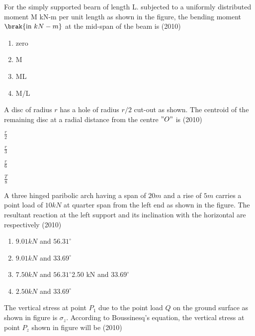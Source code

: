	\item For the simply supported bearn of length L. subjected to a uniformly distributed moment M kN-m per unit length as shown in the figure, the bending moment $\brak{\text{in } kN-m}$ at the mid-span of the beam is
	\hfill{(2010)}
     	
		\begin{enumerate}
			\item zero
            \item M
            \item ML
            \item M/L
        	\end{enumerate}	
	\item  A disc of radius $r$ has a hole of radius $r / 2$ cut-out as shown. The centroid of the remaining disc  at a radial distance from the centre $"O"$ is
	\hfill{(2010)}
        	
		\begin{enumerate}
            \begin{multicols}{2}
			\item $\frac{r}{2}$
			\item $\frac{r}{3}$
			\item $\frac{r}{6}$
			\item $\frac{T}{8}$
   \end{multicols}
        	\end{enumerate}	
	\item A three hinged paribolic arch having a span of $20 m$ and a rise of $5 m$ carries a point load of $10 kN$ at quarter span from the left end as shown in the figure. The resultant reaction at the left support and its inclination with the horizontal are respectively
	\hfill{(2010)}
         	
                \begin{enumerate}
			\item $9.01 kN$ and $56.31^{\circ}$
			\item $9.01 kN$ and $33.69^{\circ}$
			\item $7.50 kN$ and $56.31^{\circ}$2.50 kN and $33.69^{\circ}$
			\item $2.50 kN$ and $33.69^{\circ}$
        	\end{enumerate}		
	\item The vertical stress at point $P_{1}$ due to the point load $Q$ on the ground surface as shown in figure is $\sigma_{z}$. According to Boussinesq's equation, the vertical stress at point $P_{z}$ shown in figure will be
	\hfill{(2010)}
        	
